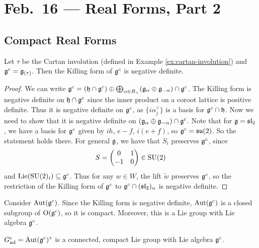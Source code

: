 \chapter{Feb.~16 --- Real Forms, Part 2}

\section{Compact Real Forms}

\begin{prop}
  Let $\tau$ be the Cartan involution
  (defined in Example \ref{ex:cartan-involution})
  and $\mathfrak{g}^c = \mathfrak{g}_{(\tau)}$.
  Then the Killing form of $\mathfrak{g}^c$ is
  negative definite.
\end{prop}

\begin{proof}
  We can write $\mathfrak{g}^c = (\mathfrak{h} \cap \mathfrak{g}^c) \oplus \bigoplus_{\alpha \in R_+} (\mathfrak{g}_\alpha \oplus \mathfrak{g}_{-\alpha}) \cap \mathfrak{g}^c$.
  The Killing form is negative definite on
  $\mathfrak{h} \cap \mathfrak{g}^c$ since the
  inner product on a coroot lattice is
  positive definite. Thus it is
  negative definite on $\mathfrak{g}^c$, as
  $\{i \alpha_j^\vee\}$ is a basis for
  $\mathfrak{g}^c \cap \mathfrak{h}$. Now we
  need to show that it is negative definite
  on $(\mathfrak{g}_{\alpha} \oplus \mathfrak{g}_{-\alpha}) \cap \mathfrak{g}^c$.
  Note that for $\mathfrak{g} = \mathfrak{sl}_2$,
  we have a basis for $\mathfrak{g}^c$ given by
  $ih$, $e - f$, $i(e + f)$, so
  $\mathfrak{g}^c = \mathfrak{su}(2)$. So the
  statement holds there. For general
  $\mathfrak{g}$, we have that $S_i$ preserves
  $\mathfrak{g}^c$, since
  \[
    S =
    \begin{pmatrix}
      0 & 1 \\
      -1 & 0
    \end{pmatrix} \in \operatorname{SU}(2)
  \]
  and $\operatorname{Lie}(\operatorname{SU}(2)_i) \subseteq \mathfrak{g}^c$.
  Thus for any $w \in W$, the lift $\widetilde{w}$
  preserves $\mathfrak{g}^c$, so the restriction
  of the Killing form of $\mathfrak{g}^c$ to
  $\mathfrak{g}^c \cap (\mathfrak{sl}_2)_\alpha$
  is negative definite.
\end{proof}

\begin{remark}
  Consider $\operatorname{Aut}(\mathfrak{g}^c)$. Since the Killing
  form is negative definite,
  $\operatorname{Aut}(\mathfrak{g}^c)$ is a closed subgroup of
  $\operatorname{O}(\mathfrak{g}^c)$, so it is compact.
  Moreover, this is a Lie group with
  Lie algebra $\mathfrak{g}^c$.
\end{remark}

\begin{corollary}
  $G^c_{\mathrm{ad}} = \operatorname{Aut}(\mathfrak{g}^c)^\circ$
  is a connected, compact Lie group with
  Lie algebra $\mathfrak{g}^c$.
\end{corollary}

